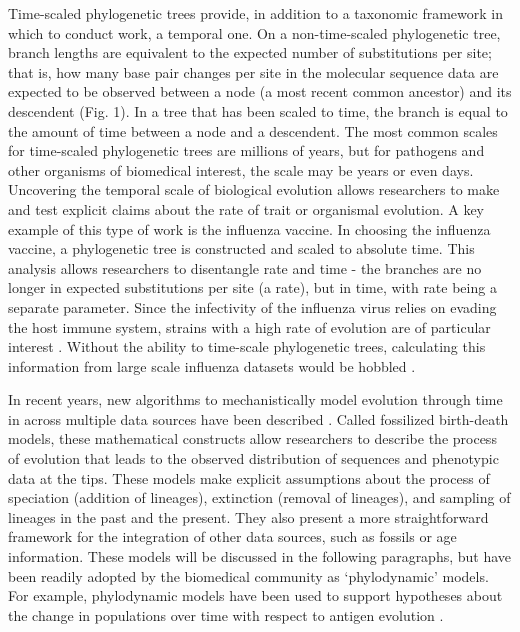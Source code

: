 \documentclass[]{article}
\begin{document}
Time-scaled phylogenetic trees provide, in addition to a taxonomic framework in which to conduct work, a temporal one.
On a non-time-scaled phylogenetic tree, branch lengths are equivalent to the expected number of substitutions per site; that is, how many base pair changes per site in the molecular sequence data are expected to be observed between a node (a most recent common ancestor) and its descendent (Fig. 1). 
In a tree that has been scaled to time, the branch is equal to the amount of time between a node and a descendent. 
The most common scales for time-scaled phylogenetic trees are millions of years, but for pathogens and other organisms of biomedical interest, the scale may be years or even days.
Uncovering the temporal scale of biological evolution allows researchers to make and test explicit claims about the rate of trait or organismal evolution.
A key example of this type of work is the influenza vaccine.
In choosing the influenza vaccine, a phylogenetic tree is constructed and scaled to absolute time.
This analysis allows researchers to disentangle rate and time - the branches are no longer in expected substitutions per site (a rate), but in time, with rate being a separate parameter.
Since the infectivity of the influenza virus relies on evading the host immune system, strains with a high rate of evolution are of particular interest \cite{timofeeva2017}.
Without the ability to time-scale phylogenetic trees, calculating this information from large scale influenza datasets would be hobbled \cite{paessler2017}.
\par
In recent years, new algorithms to mechanistically model evolution through time in across multiple data sources have been described \cite{stadler2010, heath2014, stadler2017}. 
Called fossilized birth-death models, these mathematical constructs allow researchers to describe the process of evolution that leads to the observed distribution of sequences and phenotypic data at the tips.
These models make explicit assumptions about the process of speciation (addition of lineages), extinction (removal of lineages), and sampling of lineages in the past and the present.
They also present a more straightforward framework for the integration of other data sources, such as fossils or age information.
These models will be discussed in the following paragraphs, but have been readily adopted by the biomedical community as `phylodynamic' models.
For example, phylodynamic models have been used to support hypotheses about the change in populations over time with respect to antigen evolution \cite{Bell432054}.
\end{document}
